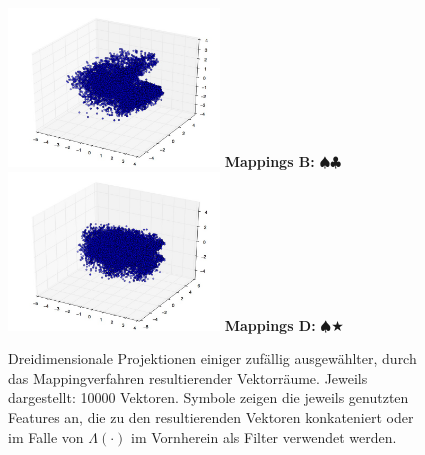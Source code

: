 \begin{itemize}
\begin{figure}[h]
\begin{multicols}{2}
    \columnbreak

    \includegraphics[width=0.5\textwidth]{../img/mappings_get10000_occ100.jpg}
    \textbf{Mappings B:} $\spadesuit\clubsuit$
    \includegraphics[width=0.5\textwidth]{../img/mappings10000_occ.jpg}
    \textbf{Mappings D:} $\spadesuit\bigstar$
  \end{multicols}

  \flushleft
  \caption[Dreidimensionale Projektionen einiger durch das Mappingverfahren resultierender Vektorräume]{Dreidimensionale
   Projektionen einiger zufällig ausgewählter, durch das Mappingverfahren resultierender Vektorräume.
   Jeweils dargestellt: 10000 Vektoren. Symbole zeigen die jeweils genutzten Features an, die zu den resultierenden
   Vektoren konkateniert oder im Falle von $\Lambda(\cdot)$ im Vornherein als Filter verwendet werden.\label{fig:proj_map}}
\end{figure}

\end{itemize}

